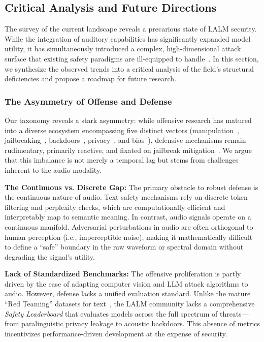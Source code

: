 \documentclass{llmxive}
\begin{document}
\subsection{Critical Analysis and Future Directions}

The survey of the current landscape reveals a precarious state of LALM security. While the integration of auditory capabilities has significantly expanded model utility, it has simultaneously introduced a complex, high-dimensional attack surface that existing safety paradigms are ill-equipped to handle~\cite{li2025audiotrust}.
In this section, we synthesize the observed trends into a critical analysis of the field's structural deficiencies and propose a roadmap for future research.

\subsubsection{The Asymmetry of Offense and Defense}

Our taxonomy reveals a stark asymmetry: while offensive research has matured into a diverse ecosystem encompassing five distinct vectors (manipulation~\cite{sadasivan2025attacker}, jailbreaking~\cite{cheng2025jailbreak}, backdoors~\cite{fortier2025backdoor}, privacy~\cite{wang2026hearsay}, and bias~\cite{tam2025medvoicebias}), defensive mechanisms remain rudimentary, primarily reactive, and fixated on jailbreak mitigation~\cite{yang2025reshaping,jin2025almguard}. We argue that this imbalance is not merely a temporal lag but stems from challenges inherent to the audio modality.

\textbf{The Continuous vs. Discrete Gap:} The primary obstacle to robust defense is the continuous nature of audio. Text safety mechanisms rely on discrete token filtering and perplexity checks, which are computationally efficient and interpretably map to semantic meaning. In contrast, audio signals operate on a continuous manifold. Adversarial perturbations in audio are often orthogonal to human perception (i.e., imperceptible noise), making it mathematically difficult to define a ``safe'' boundary in the raw waveform or spectral domain without degrading the signal's utility.

\textbf{Lack of Standardized Benchmarks:} The offensive proliferation is partly driven by the ease of adapting computer vision and LLM attack algorithms to audio. However, defense lacks a unified evaluation standard. Unlike the mature ``Red Teaming'' datasets for text~\cite{zou2023universal}, the LALM community lacks a comprehensive \textit{Safety Leaderboard} that evaluates models across the full spectrum of threats---from paralinguistic privacy leakage to acoustic backdoors. This absence of metrics incentivizes performance-driven development at the expense of security.
\end{document}
